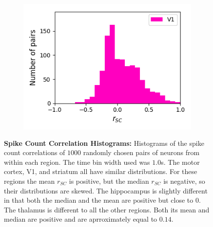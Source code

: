 \documentclass[a4paper,12pt]{article}
\theoremstyle{definition}
\begin{document}
\begin{figure}[p]
\begin{subfigure}{0.5\textwidth}
    \includegraphics[width=\textwidth]{figures/all_v1_6_1p0_correlation_histogram.png}
  \end{subfigure}
  \caption{\textbf{Spike Count Correlation Histograms:} Histograms of the spike count correlations of $1000$ randomly chosen pairs of neurons from within each region. The time bin width used was $1.0$s. The motor cortex, V1, and striatum all have similar distributions. For these regions the mean $r_{SC}$ is positive, but the median $r_{SC}$ is negative, so their distributions are skewed. The hippocampus is slightly different in that both the median and the mean are positive but close to $0$. The thalamus is different to all the other regions. Both its mean and median are positive and are aprroximately equal to $0.14$.}
  \label{fig:all_corr_histograms}
\end{figure}
\end{document}
